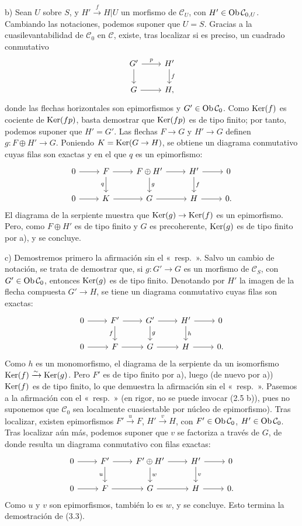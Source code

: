 b) Sean \(U\) sobre \(S\), y \(H'\xrightarrow{f}H|U\) un morfismo de \(\mathcal C_U\), con \(H'\in\operatorname{Ob}\mathcal C_{0,U}\). Cambiando las notaciones, podemos suponer que \(U=S\). Gracias a la cuasilevantabilidad de \(\mathcal C_0\) en \(\mathcal C\), existe, tras localizar si es preciso, un cuadrado conmutativo
\[
\begin{tikzcd}
G' \arrow[r,"p"] \arrow[d] & H' \arrow[d,"f"]\\
G \arrow[r] & H,
\end{tikzcd}
\]
donde las flechas horizontales son epimorfismos y \(G'\in\operatorname{Ob}\mathcal C_0\). Como \(\operatorname{Ker}(f)\) es cociente de \(\operatorname{Ker}(fp)\), basta demostrar que \(\operatorname{Ker}(fp)\) es de tipo finito; por tanto, podemos suponer que \(H'=G'\). Las flechas \(F\to G\) y \(H'\to G\) definen \(g:F\oplus H'\to G\). Poniendo \(K=\operatorname{Ker}(G\to H)\), se obtiene un diagrama conmutativo cuyas filas son exactas y en el que \(q\) es un epimorfismo:
\[
\begin{tikzcd}
0\arrow[r]&F\arrow[r]\arrow[d,"q"']&F\oplus H'\arrow[r]\arrow[d,"g"]&H'\arrow[r]\arrow[d,"f"]&0\\
0\arrow[r]&K\arrow[r]&G\arrow[r]&H\arrow[r]&0 .
\end{tikzcd}
\]
El diagrama de la serpiente muestra que \(\operatorname{Ker}(g)\to\operatorname{Ker}(f)\) es un epimorfismo. Pero, como \(F\oplus H'\) es de tipo finito y \(G\) es precoherente, \(\operatorname{Ker}(g)\) es de tipo finito por a), y se concluye.

c) Demostremos primero la afirmación sin el «~resp.~». Salvo un cambio de notación, se trata de demostrar que, si \(g:G'\to G\) es un morfismo de \(\mathcal C_S\), con \(G'\in\operatorname{Ob}\mathcal C_0\), entonces \(\operatorname{Ker}(g)\) es de tipo finito. Denotando por \(H'\) la imagen de la flecha compuesta \(G'\to H\), se tiene un diagrama conmutativo cuyas filas son exactas:
\[
\begin{tikzcd}
0\arrow[r]&F'\arrow[r]\arrow[d,"f"']&G'\arrow[r]\arrow[d,"g"]&H'\arrow[r]\arrow[d,"h"]&0\\
0\arrow[r]&F\arrow[r]&G\arrow[r]&H\arrow[r]&0 .
\end{tikzcd}
\]
Como \(h\) es un monomorfismo, el diagrama de la serpiente da un isomorfismo \(\operatorname{Ker}(f)\xrightarrow{\sim}\operatorname{Ker}(g)\). Pero \(F'\) es de tipo finito por a), luego (de nuevo por a)) \(\operatorname{Ker}(f)\) es de tipo finito, lo que demuestra la afirmación sin el «~resp.~». Pasemos a la afirmación con el «~resp.~» (en rigor, no se puede invocar (2.5 b)), pues no suponemos que \(\mathcal C_0\) sea localmente cuasiestable por núcleo de epimorfismo). Tras localizar, existen epimorfismos \(F'\xrightarrow{u}F\), \(H'\xrightarrow{v}H\), con \(F'\in\operatorname{Ob}\mathcal C_0\), \(H'\in\operatorname{Ob}\mathcal C_0\). Tras localizar aún más, podemos suponer que \(v\) se factoriza a través de \(G\), de donde resulta un diagrama conmutativo con filas exactas:
\[
\begin{tikzcd}
0\arrow[r]&F'\arrow[r]\arrow[d,"u"']&F'\oplus H'\arrow[r]\arrow[d,"w"]&H'\arrow[r]\arrow[d,"v"]&0\\
0\arrow[r]&F\arrow[r]&G\arrow[r]&H\arrow[r]&0 .
\end{tikzcd}
\]
Como \(u\) y \(v\) son epimorfismos, también lo es \(w\), y se concluye. Esto termina la demostración de (3.3).

